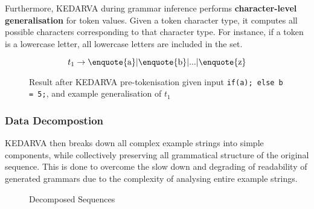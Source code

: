 Furthermore, KEDARVA during grammar inference performs \textbf{character-level generalisation} for token values. Given a token character type,  it computes all possible characters corresponding to that character type. For instance, if a token is a lowercase letter, all lowercase letters are included in the set.

\begin{figure}[H]
\centering
{}

\[
t_1 \rightarrow \text{\enquote{a}}|\text{\enquote{b}}|...|\text{\enquote{z}}
\]

\caption{Result after KEDARVA pre-tokenisation given input \texttt{if(a); else b = 5;}, and example generalisation of $t_1$}
\label{fig:pre-tokenised KEDARVA}
\end{figure}

\subsubsection{Data Decompostion}

KEDARVA then breaks down all complex example strings into simple components, while collectively preserving all grammatical structure of the original sequence. This is done to overcome the slow down and degrading of readability of generated grammars due to the complexity of analysing entire example strings.

\begin{figure}[h!]
\centering
{}
\caption{Decomposed Sequences}
\label{fig:decomp KEDARVA}
\end{figure}

